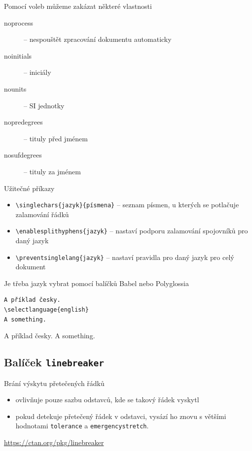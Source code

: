 \documentclass{csbulletin}
\begin{document}
  Pomocí voleb můžeme zakázat některé vlastnosti

  \begin{description}
    \item [noprocess] – nespouštět zpracování dokumentu automaticky
    \item [noinitials] – iniciály
    \item [nounits] – SI jednotky
    \item [nopredegrees] – tituly před jménem
    \item [nosufdegrees] – tituly za jménem
  \end{description}

  Užitečné příkazy

  \begin{itemize}
    \item \verb|\singlechars{jazyk}{písmena}| -- seznam písmen, u kterých se potlačuje zalamování řádků

    \item \verb|\enablesplithyphens{jazyk}| -- nastaví podporu zalamování spojovníků pro daný jazyk
    \item \verb|\preventsinglelang{jazyk}| -- nastaví pravidla pro daný jazyk pro celý dokument
  \end{itemize}

Je třeba jazyk vybrat pomocí balíčků Babel nebo Polyglossia

\begin{verbatim}
A příklad česky.
\selectlanguage{english}
A something.
\end{verbatim}

    \preventsingledebugon

A příklad česky.
A something.

    \preventsingledebugoff


\newcommand\testbox[1]{%
  \parbox{120pt}{%
    \parindent=15pt%
    \tolerance=1%
    \pretolerance=1%
    #1
  }%
}

\newcommand\printtest[1]{%
  \linebreakerdisable%
  \noindent\testbox{%
    #1
    \par\medskip\noindent\hfill\textbf{Bez Linebreakeru}\hfill\null
  }%
  \linebreakerenable%
  \hfill%
  \testbox{%
    #1
    \par\medskip\noindent\hfill\textbf{S Linebreakerem}\hfill\null
  }%
}

  \subsection{Balíček \texttt{linebreaker}}
  Brání výskytu přetečených řádků
  \begin{itemize}
    \item ovlivňuje pouze sazbu  odstavců, kde se takový řádek vyskytl
    \item pokud detekuje přetečený řádek v odstavci, vysází ho znovu s většími hodnotami
      \verb|tolerance| a \verb|emergencystretch|.
  \end{itemize}
  \url{https://ctan.org/pkg/linebreaker}
\end{document}
